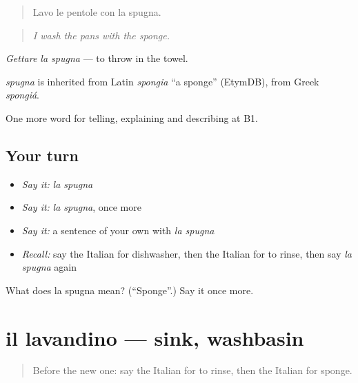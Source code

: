 \begin{quote}
Lavo le pentole con la spugna.
\end{quote}

\begin{quote}
\emph{I wash the pans with the sponge.}
\end{quote}

\emph{Gettare la spugna} — to throw in the towel.

\begin{cousinweb}
\emph{spugna} is inherited from Latin \emph{spongia} \textquotedblleft{}a sponge\textquotedblright{} (EtymDB), from Greek \emph{spongiá}.
\end{cousinweb}

\begin{grammarlens}[title={What you've built}]
One more word for telling, explaining and describing at B1.
\end{grammarlens}

\subsection*{Your turn}
\begin{itemize}
\raggedright
  \item \emph{Say it:} \emph{la spugna}
  \item \emph{Say it:} \emph{la spugna}, once more
  \item \emph{Say it:} a sentence of your own with \emph{la spugna}
  \item \emph{Recall:} say the Italian for dishwasher, then the Italian for to rinse, then say \emph{la spugna} again
\end{itemize}

\begin{tcolorbox}[breakable,colback=teal!4,colframe=teal!35!black,title={Before you move on}]
What does la spugna mean? (\textquotedblleft{}Sponge\textquotedblright{}.) Say it once more.
\end{tcolorbox}
\section[il lavandino]{il lavandino — sink, washbasin}

\label{lesson:IT-C534-lavandino}



\begin{quote}
Before the new one: say the Italian for to rinse, then the Italian for sponge.
\end{quote}

